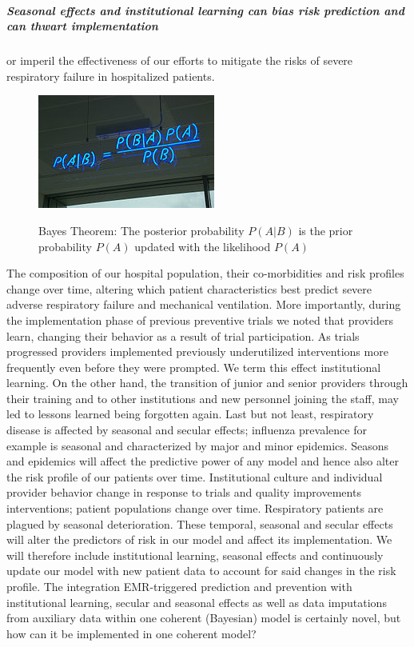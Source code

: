 \documentclass[11pt,notitlepage]{article}
\begin{document}
\subparagraph*{Seasonal effects and institutional learning can bias risk prediction and can thwart implementation} or imperil the effectiveness of our efforts to mitigate the risks of severe respiratory failure in hospitalized patients. 
\begin{figure} %
 \vspace{-10pt}
 \href{http://en.wikipedia.org/wiki/Bayes'_theorem}{ \includegraphics[scale=0.6]{Figures/BayesTheorem.jpg}}
  \vspace{-20pt}
 \caption{\footnotesize Bayes Theorem: The posterior probability $P(A|B)$ is the prior probability $P(A)$ updated with the  likelihood $P(A)$}
 \vspace{-15pt}
 \label{fig:BayesTheorem}
\end{figure} The composition of our hospital population, their co-morbidities and risk profiles change over time, altering which patient characteristics best predict severe adverse respiratory failure and mechanical ventilation. More importantly,  during the implementation phase of previous preventive trials we noted that providers learn, changing their behavior as a result of trial participation. As trials progressed providers implemented previously underutilized interventions more frequently even before they were prompted. We term this effect institutional learning. On the other hand, the transition of junior and senior providers through their training and to other institutions and new personnel joining the staff, may led to lessons learned being forgotten again. Last but not least, respiratory disease is affected by seasonal and secular effects; influenza prevalence for example is seasonal and characterized by major and minor epidemics. Seasons and epidemics will affect the predictive power of any model and hence also alter the risk profile of our patients over time. Institutional culture and individual provider behavior change in response to trials and quality improvements interventions; patient populations change over time. Respiratory patients are plagued by seasonal deterioration. These temporal, seasonal and secular effects will alter the predictors of risk in our model and affect its implementation. We will therefore include institutional learning, seasonal effects and continuously update our model with new patient data to account for said changes in the risk profile. The integration EMR-triggered prediction and prevention with  institutional learning, secular and seasonal effects as well as data imputations from auxiliary data within one coherent (Bayesian) model is certainly novel, but how can it be implemented in one coherent model? 
\end{document}
